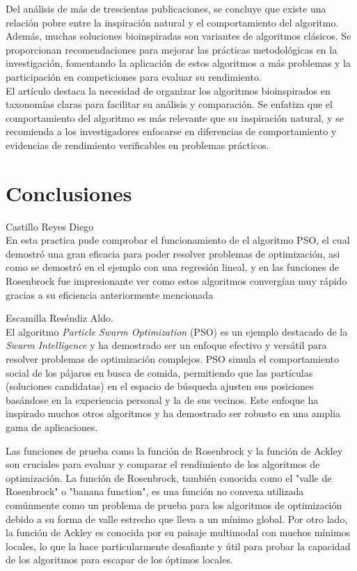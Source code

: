 \documentclass{report}
\begin{document}
    Del análisis de más de trescientas publicaciones, se concluye que existe una relación pobre entre la inspiración natural y el comportamiento del algoritmo. 
    Además, muchas soluciones bioinspiradas son variantes de algoritmos clásicos. Se proporcionan recomendaciones para mejorar las prácticas metodológicas en la investigación, 
    fomentando la aplicación de estos algoritmos a más problemas y la participación en competiciones para evaluar su rendimiento.\\


    El artículo destaca la necesidad de organizar los algoritmos bioinspirados en taxonomías claras para facilitar su análisis y comparación. Se enfatiza que el comportamiento del algoritmo es más relevante que su inspiración natural, 
    y se recomienda a los investigadores enfocarse en diferencias de comportamiento y evidencias de rendimiento verificables en problemas prácticos.\\


    \section{Conclusiones}
    Castillo Reyes Diego\\
    En esta practica pude comprobar el funcionamiento de el algoritmo PSO, el cual demostró una gran eficacia para poder resolver problemas de optimización, asi como se demostró en el ejemplo con una regresión lineal, y en las funciones de Rosenbrock fue impresionante ver como estos algoritmos convergían muy rápido gracias a su eficiencia anteriormente mencionada
    
    Escamilla Reséndiz Aldo.\\
    El algoritmo \textit{Particle Swarm Optimization} (PSO) es un ejemplo destacado de la \textit{Swarm Intelligence} y ha demostrado ser un enfoque efectivo y versátil para resolver problemas de optimización complejos. PSO simula el comportamiento social de los pájaros en busca de comida, permitiendo que las partículas (soluciones candidatas) en el espacio de búsqueda ajusten sus posiciones basándose en la experiencia personal y la de sus vecinos. Este enfoque ha inspirado muchos otros algoritmos y ha demostrado ser robusto en una amplia gama de aplicaciones.

    Las funciones de prueba como la función de Rosenbrock y la función de Ackley son cruciales para evaluar y comparar el rendimiento de los algoritmos de optimización. La función de Rosenbrock, también conocida como el "valle de Rosenbrock" o "banana function", es una función no convexa utilizada comúnmente como un problema de prueba para los algoritmos de optimización debido a su forma de valle estrecho que lleva a un mínimo global. Por otro lado, la función de Ackley es conocida por su paisaje multimodal con muchos mínimos locales, lo que la hace particularmente desafiante y útil para probar la capacidad de los algoritmos para escapar de los óptimos locales.
\end{document}
